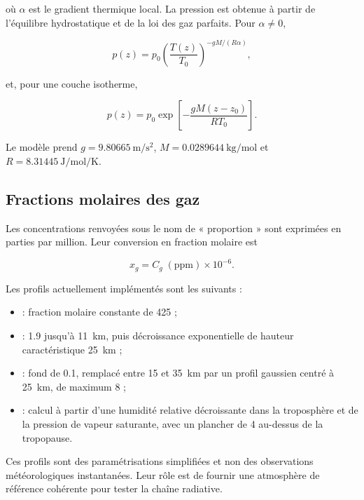 \documentclass[11pt,a4paper]{article}
\begin{document}
où $\alpha$ est le gradient thermique local. La pression est obtenue à partir
de l'équilibre hydrostatique et de la loi des gaz parfaits. Pour
$\alpha\neq0$,

\begin{equation}
  p(z)=p_0\left(\frac{T(z)}{T_0}\right)^{-gM/(R\alpha)},
  \label{eq:pression_gradient}
\end{equation}

et, pour une couche isotherme,

\begin{equation}
  p(z)=p_0\exp\!\left[-\frac{gM(z-z_0)}{RT_0}\right].
  \label{eq:pression_isotherme}
\end{equation}

Le modèle prend $g=\SI{9.80665}{\metre\per\second\squared}$,
$M=\SI{0.0289644}{\kilogram\per\mole}$ et
$R=\SI{8.31445}{\joule\per\mole\per\kelvin}$.

\subsection{Fractions molaires des gaz}

Les concentrations renvoyées sous le nom de « proportion » sont exprimées en
parties par million. Leur conversion en fraction molaire est

\begin{equation}
  x_g = C_g\;(\mathrm{ppm})\times10^{-6}.
  \label{eq:ppm}
\end{equation}

Les profils actuellement implémentés sont les suivants :

\begin{itemize}
  \item {} : fraction molaire constante de \SI{425}{\ppm} ;
  \item {} : \SI{1.9}{\ppm} jusqu'à \SI{11}{\kilo\metre}, puis
    décroissance exponentielle de hauteur caractéristique
    \SI{25}{\kilo\metre} ;
  \item {} : fond de \SI{0.1}{\ppm}, remplacé entre 15 et
    \SI{35}{\kilo\metre} par un profil gaussien centré à
    \SI{25}{\kilo\metre}, de maximum \SI{8}{\ppm} ;
  \item {} : calcul à partir d'une humidité relative décroissante dans
    la troposphère et de la pression de vapeur saturante, avec un plancher de
    \SI{4}{\ppm} au-dessus de la tropopause.
\end{itemize}

Ces profils sont des paramétrisations simplifiées et non des observations
météorologiques instantanées. Leur rôle est de fournir une atmosphère de
référence cohérente pour tester la chaîne radiative.
\end{document}
